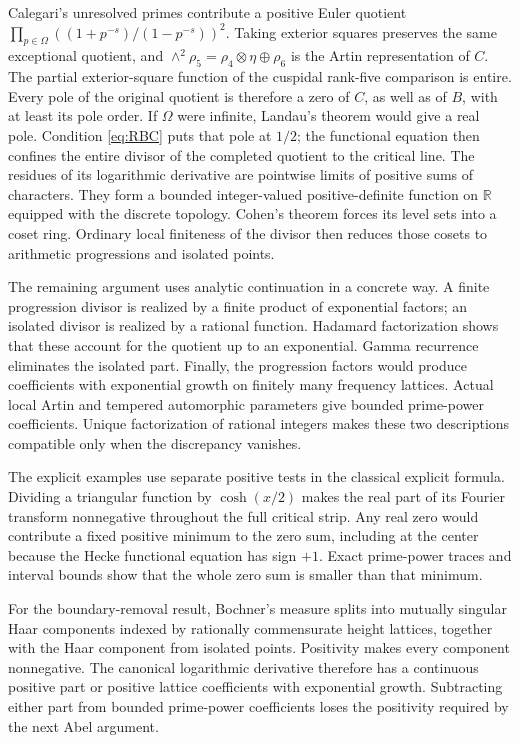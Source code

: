 \documentclass[11pt]{article}
\theoremstyle{definition}
\theoremstyle{remark}
\newcommand{\R}{\mathbb R}
\newcommand{\rh}{\rho_5}
\numberwithin{equation}{section}
\begin{document}
Calegari's unresolved primes contribute a positive Euler quotient
$\prod_{p\in\Omega}((1+p^{-s})/(1-p^{-s}))^2$.
Taking exterior squares preserves the same exceptional quotient, and $\wedge^2\rh=\rho_4\otimes\eta\oplus\rho_6$ is the Artin representation of $C$. The partial exterior-square function of the cuspidal rank-five comparison is entire. Every pole of the original quotient is therefore a zero of $C$, as well as of $B$, with at least its pole order. If $\Omega$ were infinite, Landau's theorem would give a real pole. Condition \eqref{eq:RBC} puts that pole at $1/2$; the functional equation then confines the entire divisor of the completed quotient to the critical line. The residues of its logarithmic derivative are pointwise limits of positive sums of characters. They form a bounded integer-valued positive-definite function on $\R$ equipped with the discrete topology. Cohen's theorem forces its level sets into a coset ring. Ordinary local finiteness of the divisor then reduces those cosets to arithmetic progressions and isolated points.

The remaining argument uses analytic continuation in a concrete way. A finite progression divisor is realized by a finite product of exponential factors; an isolated divisor is realized by a rational function. Hadamard factorization shows that these account for the quotient up to an exponential. Gamma recurrence eliminates the isolated part. Finally, the progression factors would produce coefficients with exponential growth on finitely many frequency lattices. Actual local Artin and tempered automorphic parameters give bounded prime-power coefficients. Unique factorization of rational integers makes these two descriptions compatible only when the discrepancy vanishes.

The explicit examples use separate positive tests in the classical explicit formula. Dividing a triangular function by $\cosh(x/2)$ makes the real part of its Fourier transform nonnegative throughout the full critical strip. Any real zero would contribute a fixed positive minimum to the zero sum, including at the center because the Hecke functional equation has sign $+1$. Exact prime-power traces and interval bounds show that the whole zero sum is smaller than that minimum.

For the boundary-removal result, Bochner's measure splits into mutually singular Haar components indexed by rationally commensurate height lattices, together with the Haar component from isolated points. Positivity makes every component nonnegative. The canonical logarithmic derivative therefore has a continuous positive part or positive lattice coefficients with exponential growth. Subtracting either part from bounded prime-power coefficients loses the positivity required by the next Abel argument.
\end{document}
